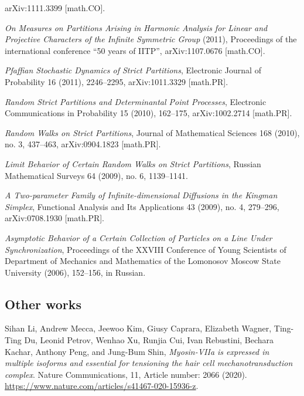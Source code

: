 \documentclass[letterpaper,11pt]{article}
\begin{document}
\begin{etaremune}
	      arXiv:1111.3399 [math.CO].
	\item
	      \emph{On Measures on Partitions Arising in Harmonic Analysis for
		      Linear and Projective Characters of the Infinite Symmetric Group} (2011),
	      Proceedings of the international conference ``50 years of
	      IITP'', arXiv:1107.0676 [math.CO].
	\item
	      \emph{Pfaffian Stochastic Dynamics of Strict Partitions},
	      Electronic Journal of Probability 16 (2011), 2246--2295,
	      arXiv:1011.3329 [math.PR].
	\item
	      \emph{Random Strict Partitions and Determinantal Point
		      Processes},
	      Electronic Communications in Probability 15 (2010), 162--175,
	      arXiv:1002.2714 [math.PR].
	\item
	      \emph{Random Walks on Strict Partitions}, Journal of
	      Mathematical Sciences 168 (2010), no. 3, 437--463,
	      arXiv:0904.1823 [math.PR].
	\item
	      \emph{Limit Behavior of Certain Random Walks on Strict
		      Partitions},
	      Russian Mathematical Surveys 64 (2009), no. 6, 1139--1141.
	\item
	      \emph{A Two-parameter Family of Infinite-dimensional Diffusions
		      in the Kingman Simplex}, Functional Analysis and Its
	      Applications 43 (2009), no. 4, 279--296, arXiv:0708.1930
	      [math.PR].
	\item
	      \emph{Asymptotic Behavior of a Certain Collection of Particles
		      on a Line Under Synchronization}, Proceedings of the XXVIII
	      Conference of Young Scientists of Department of Mechanics and
	      Mathematics of the Lomonosov Moscow State University (2006), 152--156, in
	      Russian.
\end{etaremune}

\subsection*{Other works}

\begin{etaremune}
	\renewcommand{\labelenumi}{[\theenumi]}
	\item
	Sihan Li, Andrew Mecca, Jeewoo Kim, Giusy Caprara, Elizabeth Wagner, Ting-Ting Du, Leonid Petrov, Wenhao Xu, Runjia Cui, Ivan Rebustini, Bechara Kachar, Anthony Peng, and Jung-Bum Shin,
	\emph{Myosin-VIIa is expressed in multiple isoforms and essential for tensioning the hair cell mechanotransduction complex}.
	Nature Communications, 11, Article number: 2066 (2020). \url{https://www.nature.com/articles/s41467-020-15936-z}.
\end{etaremune}
\end{document}
